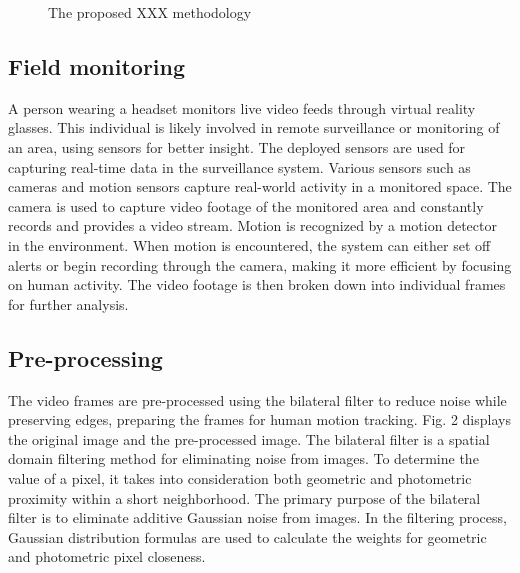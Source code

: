 \documentclass[conference]{IEEEtran}
\begin{document}
\begin{figure}[htbp]
\centering
{}
\caption{The proposed XXX methodology}
\label{fig1}
\end{figure}

\subsection{Field monitoring}
A person wearing a headset monitors live video feeds through virtual reality glasses. This individual is likely involved in remote surveillance or monitoring of an area, using sensors for better insight. The deployed sensors are used for capturing real-time data in the surveillance system. Various sensors such as cameras and motion sensors capture real-world activity in a monitored space. The camera is used to capture video footage of the monitored area and constantly records and provides a video stream. Motion is recognized by a motion detector in the environment. When motion is encountered, the system can either set off alerts or begin recording through the camera, making it more efficient by focusing on human activity. The video footage is then broken down into individual frames for further analysis.

\subsection{Pre-processing}
The video frames are pre-processed using the bilateral filter to reduce noise while preserving edges, preparing the frames for human motion tracking. Fig. 2 displays the original image and the pre-processed image. The bilateral filter is a spatial domain filtering method for eliminating noise from images. To determine the value of a pixel, it takes into consideration both geometric and photometric proximity within a short neighborhood. The primary purpose of the bilateral filter is to eliminate additive Gaussian noise from images. In the filtering process, Gaussian distribution formulas are used to calculate the weights for geometric and photometric pixel closeness.
\end{document}
